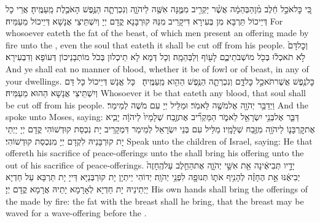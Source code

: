 {כִּ֚י כׇּל\maqqaf אֹכֵ֣ל חֵ֔לֶב מִ֨ן\maqqaf הַבְּהֵמָ֔ה אֲשֶׁ֨ר יַקְרִ֥יב מִמֶּ֛נָּה אִשֶּׁ֖ה לַיהֹוָ֑ה וְנִכְרְתָ֛ה הַנֶּ֥פֶשׁ הָאֹכֶ֖לֶת מֵֽעַמֶּֽיהָ׃}
{אֲרֵי כָל דְּיֵיכוֹל תַּרְבָּא מִן בְּעִירָא דִּיקָרֵיב מִנַּהּ קוּרְבָּנָא קֳדָם יְיָ וְיִשְׁתֵּיצֵי אֲנָשָׁא דְּיֵיכוֹל מֵעַמֵּיהּ׃}
{For whosoever eateth the fat of the beast, of which men present an offering made by fire unto the \lord, even the soul that eateth it shall be cut off from his people.}{}
{וְכׇל\maqqaf דָּם֙ לֹ֣א תֹאכְל֔וּ בְּכֹ֖ל מוֹשְׁבֹתֵיכֶ֑ם לָע֖וֹף וְלַבְּהֵמָֽה׃}
{וְכָל דְּמָא לָא תֵיכְלוּן בְּכֹל מוֹתְבָנֵיכוֹן דְּעוֹפָא וְדִבְעִירָא׃}
{And ye shall eat no manner of blood, whether it be of fowl or of beast, in any of your dwellings.}{}
{כׇּל\maqqaf נֶ֖פֶשׁ אֲשֶׁר\maqqaf תֹּאכַ֣ל כׇּל\maqqaf דָּ֑ם וְנִכְרְתָ֛ה הַנֶּ֥פֶשׁ הַהִ֖וא מֵֽעַמֶּֽיהָ׃ \petucha {}}
{כָּל אֱנָשׁ דְּיֵיכוֹל כָּל דַּם וְיִשְׁתֵּיצֵי אֲנָשָׁא הַהוּא מֵעַמֵּיהּ׃}
{Whosoever it be that eateth any blood, that soul shall be cut off from his people.}{}
{וַיְדַבֵּ֥ר יְהֹוָ֖ה אֶל\maqqaf מֹשֶׁ֥ה לֵּאמֹֽר׃}
{וּמַלֵּיל יְיָ עִם מֹשֶׁה לְמֵימַר׃}
{And the \lord\space spoke unto Moses, saying:}{}
{דַּבֵּ֛ר אֶל\maqqaf בְּנֵ֥י יִשְׂרָאֵ֖ל לֵאמֹ֑ר הַמַּקְרִ֞יב אֶת\maqqaf זֶ֤בַח שְׁלָמָיו֙ לַיהֹוָ֔ה יָבִ֧יא אֶת\maqqaf קׇרְבָּנ֛וֹ לַיהֹוָ֖ה מִזֶּ֥בַח שְׁלָמָֽיו׃}
{מַלֵּיל עִם בְּנֵי יִשְׂרָאֵל לְמֵימַר דִּמְקָרֵיב יָת נִכְסַת קוּדְשׁוֹהִי קֳדָם יְיָ יַיְתֵי יָת קוּרְבָּנֵיהּ לִקְדָם יְיָ מִנִּכְסַת קוּדְשׁוֹהִי׃}
{Speak unto the children of Israel, saying: He that offereth his sacrifice of peace-offerings unto the \lord\space shall bring his offering unto the \lord\space out of his sacrifice of peace-offerings.}{}
{יָדָ֣יו תְּבִיאֶ֔ינָה אֵ֖ת אִשֵּׁ֣י יְהֹוָ֑ה אֶת\maqqaf הַחֵ֤לֶב עַל\maqqaf הֶֽחָזֶה֙ יְבִיאֶ֔נּוּ אֵ֣ת הֶחָזֶ֗ה לְהָנִ֥יף אֹת֛וֹ תְּנוּפָ֖ה לִפְנֵ֥י יְהֹוָֽה׃}
{יְדוֹהִי יֵיתְיָן יָת קוּרְבְּנַיָּא דַּייָ יָת תַּרְבָּא עַל חַדְיָא יַיְתֵינֵיהּ יָת חַדְיָא לְאָרָמָא יָתֵיהּ אֲרָמָא קֳדָם יְיָ׃}
{His own hands shall bring the offerings of the \lord\space made by fire: the fat with the breast shall he bring, that the breast may be waved for a wave-offering before the \lord.}{}
